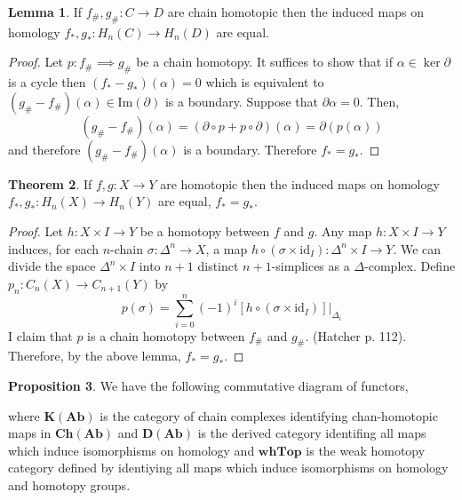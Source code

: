 \documentclass[12pt]{extarticle}
\newcommand{\id}{\mathrm{id}}
\newcommand{\Top}{\mathbf{Top}}
\newcommand{\hTop}{\mathbf{hTop}}
\renewcommand{\Im}[1]{\mathrm{Im}(#1)}
\theoremstyle{definition}
\newtheorem{theorem}{Theorem}[section]
\newtheorem{lemma}[theorem]{Lemma}
\newtheorem{proposition}[theorem]{Proposition}
\begin{document}
\begin{lemma}
If $f_{\#}, g_{\#} : C \to D$ are chain homotopic then the induced maps on homology $f_*, g_* : H_n(C) \to H_n(D)$ are equal.
\end{lemma}

\begin{proof}
Let $p : f_{\#} \implies g_{\#}$ be a chain homotopy. It suffices to show that if $\alpha \in \ker{\partial}$ is a cycle then $(f_* - g_*)(\alpha) = 0$ which is equivalent to $(g_{\#} - f_{\#})(\alpha) \in \Im{\partial}$ is a boundary. Suppose that $\partial \alpha = 0$. Then, 
\[ (g_{\#} - f_{\#})(\alpha) = (\partial \circ p + p \circ \partial)(\alpha) = \partial(p(\alpha)) \]
and therefore $(g_{\#} - f_{\#})(\alpha)$ is a boundary. Therefore $f_* = g_*$. 
\end{proof}



\begin{theorem}
If $f, g : X \to Y$ are homotopic then the induced maps on homology $f_*, g_* : H_{n}(X) \to H_n(Y)$ are equal, $f_* = g_*$.
\end{theorem}

\begin{proof}
Let $h : X \times I \to Y$ be a homotopy between $f$ and $g$. Any map $h : X \times I \to Y$ induces, for each $n$-chain $\sigma : \Delta^n \to X$, a map $h \circ (\sigma \times \id_I) : \Delta^n \times I \to Y$. We can divide the space $\Delta^n \times I$ into $n+1$ distinct $n+1$-simplices as a $\Delta$-complex. Define $p_n : C_n(X) \to C_{n+1}(Y)$ by 
\[ p(\sigma) = \sum_{i = 0}^n (-1)^i [h \circ (\sigma \times \id_I)] |_{\Delta_i} \]  
I claim that $p$ is a chain homotopy between $f_{\#}$ and $g_{\#}$. (Hatcher p. 112). Therefore, by the above lemma, $f_* = g_*$.
\end{proof}

\begin{proposition}
We have the following commutative diagram of functors,
\begin{center}
\end{center}
where $\mathbf{K(Ab)}$ is the category of chain complexes identifying chan-homotopic maps in $\mathbf{Ch(Ab)}$ and $\mathbf{D(Ab)}$ is the derived category identifing all maps which induce isomorphisms on homology and $\mathbf{whTop}$ is the weak homotopy category defined by identiying all maps which induce isomorphisms on homology and homotopy groups. 
\end{proposition}
\end{document}
